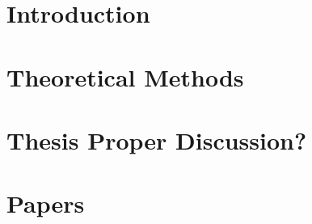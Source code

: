 \documentclass[oneside]{bThesis} %
\author{J\'on Bergmann Maronsson}
\title{\pending}
\begin{document}


\part{Introduction}
\label{part:introduction}

\part{Theoretical Methods}
\label{part:theory}

\part{Thesis Proper \pending Discussion?} 
\label{part:thesis}






\newpage
{}


\part{Papers}
\label{part:papers}



%
%
%
\end{document}
